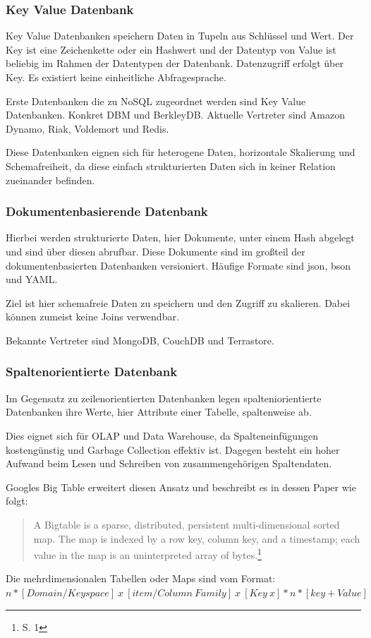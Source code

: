 \subsubsection{Key Value Datenbank}

Key Value Datenbanken speichern Daten in Tupeln aus Schlüssel und Wert.
Der Key ist eine Zeichenkette oder ein Hashwert und der Datentyp von Value ist beliebig im Rahmen der Datentypen der Datenbank.
Datenzugriff erfolgt über Key.
Es existiert keine einheitliche Abfragesprache.

Erste Datenbanken die zu NoSQL zugeordnet werden sind Key Value Datenbanken. Konkret DBM und BerkleyDB.
Aktuelle Vertreter sind Amazon Dynamo, Riak, Voldemort und Redis.

Diese Datenbanken eignen sich für heterogene Daten, horizontale Skalierung und Schemafreiheit, da diese einfach strukturierten Daten sich in keiner Relation zueinander befinden.

\subsubsection{Dokumentenbasierende Datenbank}

Hierbei werden strukturierte Daten, hier Dokumente, unter einem Hash abgelegt und sind über diesen abrufbar.
Diese Dokumente sind im großteil der dokumentenbasierten Datenbanken versioniert.
Häufige Formate sind \Gls{json}, \Gls{bson} und YAML.

Ziel ist hier schemafreie Daten zu speichern und den Zugriff zu skalieren.
Dabei können zumeist keine Joins verwendbar.

Bekannte Vertreter sind MongoDB, CouchDB und Terrastore.

\subsubsection{Spaltenorientierte Datenbank}

Im Gegensatz zu zeilenorientierten Datenbanken legen spalteniorientierte Datenbanken ihre Werte, hier Attribute einer Tabelle, spaltenweise ab.

Dies eignet sich für OLAP und Data Warehouse, da Spalteneinfügungen kostengünstig und Garbage Collection effektiv ist.
Dagegen besteht ein hoher Aufwand beim Lesen und Schreiben von zusammengehörigen Spaltendaten.

Googles Big Table erweitert diesen Ansatz und beschreibt es in dessen Paper wie folgt:
\begin{quote}
A  Bigtable  is  a  sparse,  distributed,  persistent  multi-dimensional sorted map. The map is indexed by a row key, column key, and a timestamp; each value in the map is an uninterpreted array of bytes.\footnote{\cite{paper:bigtable} S. 1}
\end{quote}
Die mehrdimensionalen Tabellen oder Maps sind vom Format:\\
$n*[Domain / Keyspace]\ x\ [item / Column\ Family]\ x\ [Key\ x]*n*[key+Value]$

